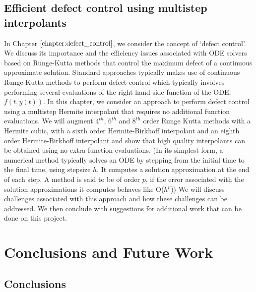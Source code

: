 \documentclass{report}
\begin{document}
\section{Efficient defect control using multistep interpolants}
In Chapter $\ref{chapter:defect_control}$, we consider the concept of `defect control'. We discuss its importance and the efficiency issues associated with ODE solvers based on Runge-Kutta methods \cite{MR3822086} that control the maximum defect of a continuous approximate solution. Standard approaches typically makes use of continuous Runge-Kutta methods \cite{MR3822086} to perform defect control which typically involves performing several evaluations of the right hand side function of the ODE, $f(t, y(t))$. In this chapter, we consider an approach to perform defect control using a multistep Hermite interpolant \cite{MR3822086} that requires no additional function evaluations. We will augment $4^{th}$, $6^{th}$ and $8^{th}$ order Runge Kutta methods with a Hermite cubic, with a sixth order Hermite-Birkhoff interpolant and an eighth order Hermite-Birkhoff interpolant and show that high quality interpolants can be obtained using no extra function evaluations. (In its simplest form, a numerical method typically solves an ODE by stepping from the initial time to the final time, using stepsize $h$. It computes a solution approximation at the end of each step. A method is said to be of order $p$, if the error associated with the solution approximations it computes behaves like O($h^p$)) We will discuss challenges associated with this approach and how these challenges can be addressed. We then conclude with suggestions for additional work that can be done on this project.













\chapter{Conclusions and Future Work}
\section{Conclusions}
\end{document}
